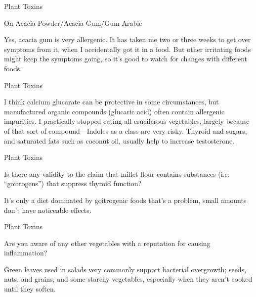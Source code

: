 \documentclass[11pt,oneside,openany,extrafontsizes]{memoir}
\begin{document}
\begin{standalonequote}{Plant Toxins}
    \begin{note}
        On Acacia Powder/Acacia Gum/Gum Arabic
    \end{note}

    \begin{answer}
        Yes, acacia gum is very allergenic. It has taken me two or three weeks to get over symptoms from it, when I accidentally got it in a food. But other irritating foods might keep the symptoms going, so it's good to watch for changes with different foods.
    \end{answer}
\end{standalonequote}

\begin{standalonequote}{Plant Toxins}

    \begin{answer}
        I think calcium glucarate can be protective in some circumstances, but manufactured organic compounds (glucaric acid) often contain allergenic impurities. I practically stopped eating all cruciferous vegetables, largely because of that sort of compound---Indoles as a class are very risky. Thyroid and sugars, and saturated fats such as coconut oil, usually help to increase testosterone.
    \end{answer}
\end{standalonequote}

\begin{qaexchange}{Plant Toxins}

    \begin{question}
        Is there any validity to the claim that millet flour contains substances (i.e. \enquote{goitrogens}) that suppress thyroid function?
    \end{question}

    \begin{answer}
      It's only a diet dominated by goitrogenic foods that's a problem, small amounts don't have noticeable effects.
    \end{answer}
\end{qaexchange}

\begin{qaexchange}{Plant Toxins}

    \begin{question}
        Are you aware of any other vegetables with a reputation for causing inflammation?
    \end{question}

    \begin{answer}
       Green leaves used in salads very commonly support bacterial overgrowth; seeds, nuts, and grains, and some starchy vegetables, especially when they aren't cooked until they soften. 
    \end{answer}
\end{qaexchange}
\end{document}
